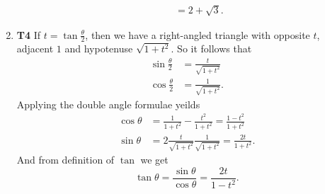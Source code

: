 \documentclass[12pt,oneside]{book}
\begin{document}
\begin{enumerate}
\begin{enumerate}
\begin{align*}
                &= 2 + \sqrt{3} .
            \end{align*}
        \end{enumerate}
        \item \textbf{T4} If $t = \tan \frac{\theta}{2}$, then we have a right-angled triangle with opposite $t$, adjacent $1$ and hypotenuse $\sqrt{1+t^2}$. So it follows that \begin{align*}
            \sin \frac{\theta}{2} &= \frac{t}{\sqrt{1 + t^2}} \\
            \cos \frac{\theta}{2} &= \frac{1}{\sqrt{1 + t^2}}.
        \end{align*} Applying the double angle formulae yeilds \begin{align*}
            \cos \theta &= \frac{1}{1+t^2} - \frac{t^2}{1+t^2} = \frac{1-t^2}{1+t^2}\\
            \sin \theta &= 2 \frac{t}{\sqrt{1 + t^2}} \frac{1}{\sqrt{1+t^2}} = \frac{2t}{1+t^2}.
        \end{align*} And from definition of $\tan$ we get \[
            \tan \theta = \frac{\sin \theta}{\cos \theta} = \frac{2t}{1-t^2}
        .\] 


\end{enumerate}
\end{document}
